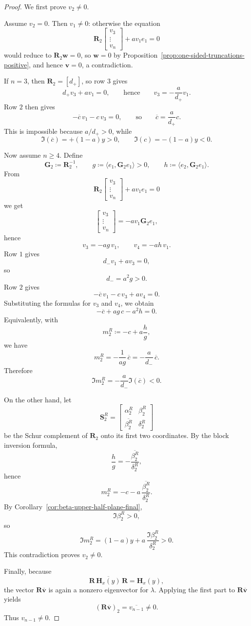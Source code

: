 \documentclass[11pt]{article}
\begin{document}
\begin{proof}
We first prove \(v_2\neq 0\).

Assume \(v_2=0\). Then \(v_1\neq 0\): otherwise the equation
\[
\mathbf R_2
\begin{bmatrix}
v_3\\ \vdots\\ v_n
\end{bmatrix}
+
a v_1 e_1
=
0
\]
would reduce to \(\mathbf R_2 \mathbf w=0\), so \(\mathbf w=0\) by Proposition~\ref{prop:one-sided-truncations-positive}, and hence \(\mathbf v=0\), a contradiction.

If \(n=3\), then \(\mathbf R_2=[d_+]\), so row \(3\) gives
\[
d_+ v_3 + a v_1=0,
\qquad\text{hence}\qquad
v_3=-\frac{a}{d_+}v_1.
\]
Row \(2\) then gives
\[
-\overline c\,v_1-c\,v_3=0,
\qquad\text{so}\qquad
\overline c=\frac{a}{d_+}c.
\]
This is impossible because \(a/d_+>0\), while
\[
\Im(\overline c)=+(1-a)y>0,
\qquad
\Im(c)=-(1-a)y<0.
\]

Now assume \(n\ge 4\). Define
\[
\mathbf G_2\coloneqq \mathbf R_2^{-1},
\qquad
g\coloneqq \langle e_1,\mathbf G_2 e_1\rangle>0,
\qquad
h\coloneqq \langle e_2,\mathbf G_2 e_1\rangle.
\]
From
\[
\mathbf R_2
\begin{bmatrix}
v_3\\ \vdots\\ v_n
\end{bmatrix}
+
a v_1 e_1
=
0
\]
we get
\[
\begin{bmatrix}
v_3\\ \vdots\\ v_n
\end{bmatrix}
=
-a v_1 \mathbf G_2 e_1,
\]
hence
\[
v_3=-a g\,v_1,
\qquad
v_4=-a h\,v_1.
\]
Row \(1\) gives
\[
d_- v_1 + a v_3=0,
\]
so
\[
d_-=a^2 g>0.
\]
Row \(2\) gives
\[
-\overline c\,v_1-c\,v_3+a v_4=0.
\]
Substituting the formulas for \(v_3\) and \(v_4\), we obtain
\[
-\overline c + a g\,c - a^2 h =0.
\]
Equivalently, with
\[
m_2^R\coloneqq -c+a\frac{h}{g},
\]
we have
\[
m_2^R=-\frac{1}{ag}\,\overline c=-\frac{a}{d_-}\,\overline c.
\]
Therefore
\[
\Im m_2^R=-\frac{a}{d_-}\Im(\overline c)<0.
\]

On the other hand, let
\[
\mathbf S_2^R=
\begin{bmatrix}
\alpha_2^R&\beta_2^R\\
\overline{\beta_2^R}&\delta_2^R
\end{bmatrix}
\]
be the Schur complement of \(\mathbf R_2\) onto its first two coordinates. By the block inversion formula,
\[
\frac{h}{g}
=
-\frac{\overline{\beta_2^R}}{\delta_2^R},
\]
hence
\[
m_2^R
=
-c-a\,\frac{\overline{\beta_2^R}}{\delta_2^R}.
\]
By Corollary~\ref{cor:beta-upper-half-plane-final},
\[
\Im\beta_2^R>0,
\]
so
\[
\Im m_2^R
=
(1-a)y+a\,\frac{\Im\beta_2^R}{\delta_2^R}>0.
\]
This contradiction proves \(v_2\neq 0\).

Finally, because
\[
\mathbf R\,\overline{\mathbf H_x(y)}\,\mathbf R=\mathbf H_x(y),
\]
the vector \(\mathbf R\overline{\mathbf v}\) is again a nonzero eigenvector for \(\lambda\). Applying the first part to \(\mathbf R\overline{\mathbf v}\) yields
\[
(\mathbf R\overline{\mathbf v})_2=\overline{v_{n-1}}\neq 0.
\]
Thus \(v_{n-1}\neq 0\).
\end{proof}
\end{document}
